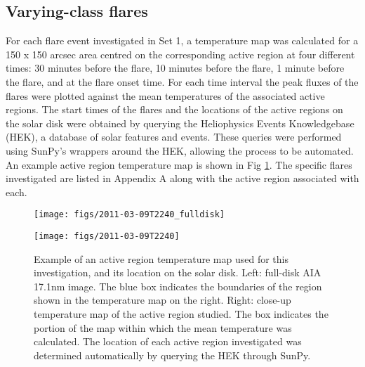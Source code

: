 \documentclass[namedreferences]{solarphysics}
\begin{document}
\subsection{Varying-class flares}
For each flare event investigated in Set 1, a temperature map was calculated for a 150 x 150 arcsec area centred on the corresponding active region at four different times: 30 minutes before the flare, 10 minutes before the flare, 1 minute before the flare, and at the flare onset time.
For each time interval the peak fluxes of the flares were plotted against the mean temperatures of the associated active regions.
The start times of the flares and the locations of the active regions on the solar disk were obtained by querying the Heliophysics Events Knowledgebase (HEK), a database of solar features and events.
These queries were performed using SunPy's wrappers around the HEK, allowing the process to be automated.
An example active region temperature map is shown in Fig \ref{fig:ar-demo}.
The specific flares investigated are listed in Appendix A along with the active region associated with each. %

\begin{figure}
  \centerline{\texttt{[image: figs/2011-03-09T2240\_fulldisk]}}
  \centerline{\texttt{[image: figs/2011-03-09T2240]}}
\caption{Example of an active region temperature map used for this investigation, and its location on the solar disk.
Left: full-disk AIA 17.1nm image.
The blue box indicates the boundaries of the region shown in the temperature map on the right.
Right: close-up temperature map of the active region studied.
The box indicates the portion of the map within which the mean temperature was calculated.
The location of each active region investigated was determined automatically by querying the HEK through SunPy.\label{fig:ar-demo}}
\end{figure}
\end{document}
